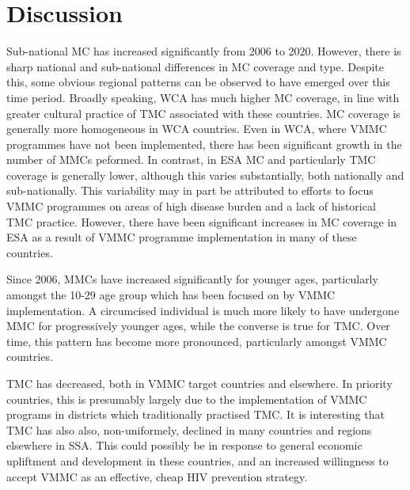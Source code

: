 \documentclass{article}
\begin{document}

% 

\section{Discussion}
\label{sec:orgca35e01}

Sub-national MC has increased significantly from 2006 to 2020. 
However, there is sharp national and sub-national differences in MC coverage and type. 
Despite this, some obvious regional patterns can be observed to have emerged over this time period. 
Broadly speaking, WCA has much higher MC coverage, in line with greater cultural practice of TMC associated with these countries. 
MC coverage is generally more homogeneous in WCA countries. 
Even in WCA, where VMMC programmes have not been implemented, there has been significant growth in the number of MMCs peformed. 
In contrast, in ESA MC and particularly TMC coverage is generally lower, although this varies substantially, both nationally and sub-nationally. 
This variability may in part be attributed to efforts to focus VMMC programmes on areas of high disease burden and a lack of historical TMC practice. 
However, there have been significant increases in MC coverage in ESA as a result of VMMC programme implementation in many of these countries.

Since 2006, MMCs have increased significantly for younger ages, particularly amongst the 10-29 age group which has been focused on by VMMC implementation. 
A circumcised individual is much more likely to have undergone MMC for progressively younger ages, while the converse is true for TMC.
Over time, this pattern has become more pronounced, particularly amongst VMMC countries. 


TMC has decreased, both in VMMC target countries and elsewhere. 
In priority countries, this is presumably largely due to the implementation of VMMC programs in districts which traditionally practised TMC. 
It is interesting that TMC has also also, non-uniformely, declined in many countries and regions elsewhere in SSA. 
This could possibly be in response to general economic upliftment and development in these countries, and an increased willingness to accept VMMC as an effective, cheap HIV prevention strategy. 
\end{document}
